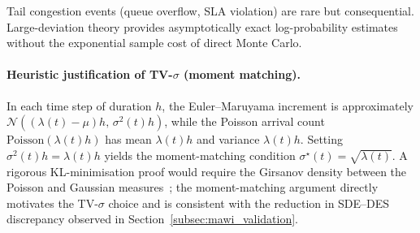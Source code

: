 \documentclass[pdflatex,sn-mathphys-num]{sn-jnl}
\theoremstyle{thmstyleone}%
\theoremstyle{thmstyletwo}%
\theoremstyle{thmstylethree}%
\begin{document}
Tail congestion events (queue overflow, SLA violation) are rare but consequential.
Large-deviation theory provides asymptotically exact log-probability estimates without
the exponential sample cost of direct Monte Carlo.

\paragraph{Heuristic justification of TV-$\sigma$ (moment matching).}
In each time step of duration $h$, the Euler--Maruyama increment is approximately
$\mathcal{N}((\lambda(t)-\mu)h,\,\sigma^2(t)h)$, while the Poisson arrival count
$\mathrm{Poisson}(\lambda(t)h)$ has mean $\lambda(t)h$ and variance $\lambda(t)h$.
Setting $\sigma^2(t)h = \lambda(t)h$ yields the moment-matching condition
$\sigma^\star(t)=\sqrt{\lambda(t)}$. A rigorous KL-minimisation proof would require the
Girsanov density between the Poisson and Gaussian measures~\cite{kabanov1978,liptser2001statistics};
the moment-matching argument directly motivates the TV-$\sigma$ choice and is consistent with
the reduction in SDE--DES discrepancy observed in
Section~\ref{subsec:mawi_validation}.
\end{document}
